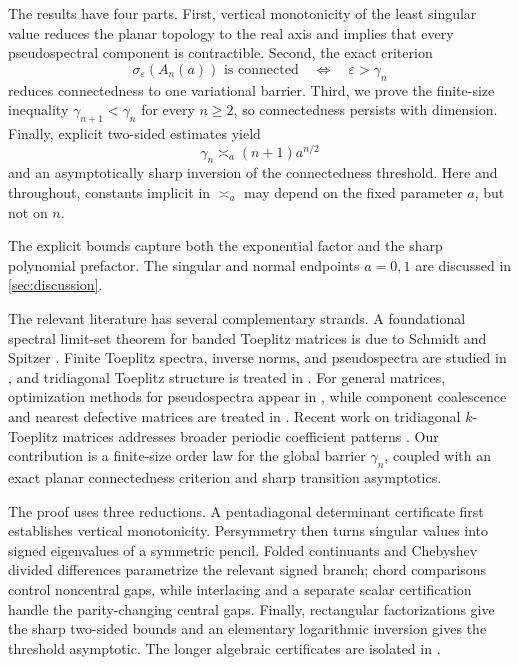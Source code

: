\documentclass[a4paper,preprint,12pt,nopreprintline,sort&compress]{elsarticle}
\numberwithin{equation}{section}
\theoremstyle{remark}
\begin{document}
The results have four parts.  First, vertical monotonicity of the least
singular value reduces the planar topology to the real axis and implies that
every pseudospectral component is contractible.  Second, the exact criterion
\[
 \sigma_\varepsilon(A_n(a))\text{ is connected}
 \quad\Longleftrightarrow\quad \varepsilon>\gamma_n
\]
reduces connectedness to one variational barrier.  Third, we prove the
finite-size inequality
\(\gamma_{n+1}<\gamma_n\) for every \(n\geq2\), so connectedness persists
with dimension.  Finally, explicit two-sided estimates yield
\begin{equation}\label{eq:intro-barrier-order}
 \gamma_n\asymp_a(n+1)a^{n/2}
\end{equation}
and an asymptotically sharp inversion of the connectedness threshold.  Here
and throughout, constants implicit in \(\asymp_a\) may depend on the fixed
parameter \(a\), but not on \(n\).

The explicit bounds capture both the exponential factor and the sharp
polynomial prefactor.  The singular and normal endpoints \(a=0,1\) are
discussed in \cref{sec:discussion}.

The relevant literature has several complementary strands.  A foundational
spectral limit-set theorem for banded Toeplitz matrices is due to Schmidt and
Spitzer \cite{SchmidtSpitzer1960}.  Finite Toeplitz spectra, inverse norms,
and pseudospectra are studied in
\cite{ReichelTrefethen1992,BottcherGrudsky2005}, and tridiagonal Toeplitz
structure is treated in \cite{NoschesePasquiniReichel2013}.  For general
matrices, optimization methods for pseudospectra appear in
\cite{BurkeLewisOverton2003}, while component coalescence and nearest
defective matrices are treated in \cite{AlamEtAl2011}.  Recent work on
tridiagonal \(k\)-Toeplitz matrices addresses broader periodic coefficient
patterns \cite{AmmariEtAl2025,AmmariCorrigendum2026}.  Our contribution is a
finite-size order law for the global barrier \(\gamma_n\), coupled with an
exact planar connectedness criterion and sharp transition asymptotics.

The proof uses three reductions.  A pentadiagonal determinant certificate
first establishes vertical monotonicity.  Persymmetry then turns singular
values into signed eigenvalues of a symmetric pencil.  Folded continuants
and Chebyshev divided differences parametrize the relevant signed branch;
chord comparisons control noncentral gaps, while interlacing and a separate
scalar certification handle the parity-changing central gaps.  Finally,
rectangular factorizations give the sharp two-sided bounds and an elementary
logarithmic inversion gives the threshold asymptotic.  The longer algebraic
certificates are isolated in
.
\end{document}
